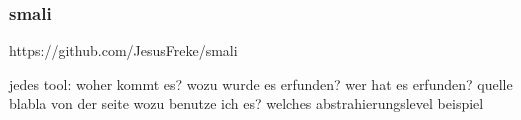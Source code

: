 \subsubsection{smali}\label{subsubsection:tools-baksmali}
https://github.com/JesusFreke/smali

jedes tool:\newline
woher kommt es?\newline
wozu wurde es erfunden?\newline
wer hat es erfunden? quelle\newline
blabla von der seite\newline
wozu benutze ich es?\newline
welches abstrahierungslevel\newline
beispiel\newline
